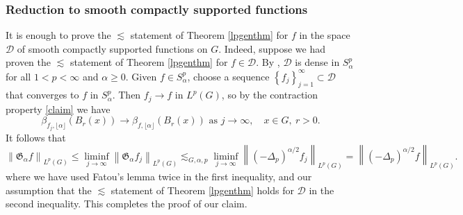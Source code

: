 \documentclass[11pt,reqno]{amsart}
\newcommand{\1}{\mathbf 1}
\begin{document}
\subsubsection{Reduction to smooth compactly supported functions}\label{subsubsec:smooth}
It is enough to prove the $\lesssim$ statement of Theorem \ref{lpgenthm} for $f$ in the space $\mathcal{D}$ of smooth compactly supported functions on $G$. Indeed, suppose we had proven the $\lesssim$ statement of Theorem \ref{lpgenthm} for $f\in \mathcal{D}$. By \cite[Theorem 4.5]{folland1975subelliptic}, $\mathcal{D}$ is dense in $S^p_\alpha$ for all $1<p<\infty$ and $\alpha\ge 0$. Given $f\in S^p_\alpha$, choose a sequence $\left\{f_j\right\}_{j=1}^\infty\subset \mathcal{D}$ that converges to $f$ in  $S^p_\alpha$. Then $f_j\to f$ in $L^p\left(G\right)$, so by the contraction property \eqref{claim} we have
\begin{displaymath} \beta_{f_j,\lfloor{\alpha}\rfloor}\left(B_r\left(x\right)\right) \to \beta_{f,\lfloor{\alpha}\rfloor}\left(B_r\left(x\right)\right)\mbox{ as }j\to \infty, \quad x\in G,~ r>0. \end{displaymath}
It follows that
\[
\left\|\mathfrak{G}_\alpha f\right\|_{L^p\left(G\right)} \le \liminf_{j\to\infty} \left\|\mathfrak{G}_\alpha f_j\right\|_{L^p\left(G\right)} \lesssim_{G,\alpha,p} \liminf_{j\to\infty} \left\|\left(-\Delta_p\right)^{\alpha/2}f_j\right\|_{L^p\left(G\right)} = \left\|\left(-\Delta_p\right)^{\alpha/2}f\right\|_{L^p\left(G\right)}.
\]
where we have used Fatou's lemma twice in the first inequality, and our assumption that the $\lesssim$ statement of Theorem \ref{lpgenthm} holds for $\mathcal{D}$ in the second inequality. This completes the proof of our claim.


\end{document}
